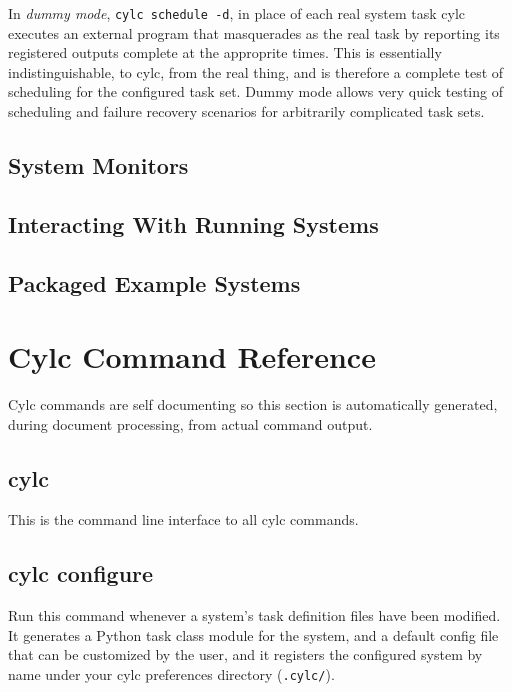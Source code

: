 \documentclass[11pt,a4paper]{article}
\begin{document}
In {\em dummy mode}, \verb=cylc schedule -d=, in place of each real
system task cylc executes an external program that masquerades as the
real task by reporting its registered outputs complete at the approprite
times. This is essentially indistinguishable, to cylc, from the real
thing, and is therefore a complete test of scheduling for the configured
task set. Dummy mode allows very quick testing of scheduling and failure
recovery scenarios for arbitrarily complicated task sets.


\subsection{System Monitors}

\subsection{Interacting With Running Systems}

\subsection{Packaged Example Systems}

\pagebreak
\section{Cylc Command Reference}

\lstset{
language=,
xleftmargin=2em,
basicstyle=\tiny\ttfamily
}

Cylc commands are self documenting so this section is automatically
generated, during document processing, from actual command output.

\subsection{cylc}

This is the command line interface to all cylc commands.

{
\color{Magenta}

}

\pagebreak
\subsection{cylc configure}

Run this command whenever a system's task definition files have been
modified. It generates a Python task class module for the system, and a
default config file that can be customized by the user, and it registers
the configured system by name under your cylc preferences directory
(\verb=.cylc/=).
\end{document}
